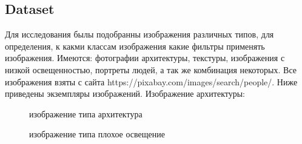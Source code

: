 \subsection{Dataset}
Для исследования былы подобранны изображения различных типов, для определения, к какми классам изображения
какие фильтры применять изображения. Имеются: фотографии архитектуры, текстуры, изображения с низкой освещенностью, портреты людей, а так же комбинация некоторых. Все изображения взяты с сайта https://pixabay.com/images/search/people/. Ниже приведены экземпляры изображений.
Изображение архитектуры:
\begin{figure}[h]
\caption{изображение типа архитектура}
\label{fig:Architecture}
\end{figure}
\begin{figure}[h]
	\caption{изображение типа плохое освещение}
	\label{fig:Night}
\end{figure}
